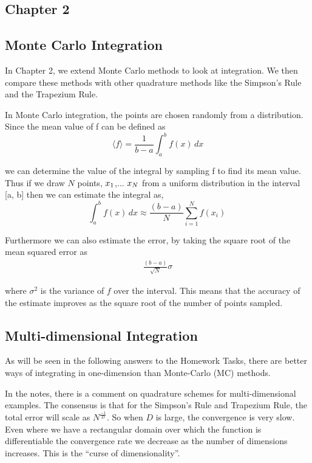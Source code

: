 \documentclass[12pt]{article}
\begin{document}
\subsection*{Chapter 2}
\subsection*{Monte Carlo Integration}

In Chapter 2, we extend Monte Carlo methods to look at integration. We then compare these methods with other quadrature methods like the Simpson's Rule and the Trapezium Rule. 

In Monte Carlo integration, the points are chosen randomly from a distribution. Since the mean value of f can be defined as
\begin{equation}
\langle f\rangle = \frac{1}{b-a}\int_{a}^{b} f(x) \,dx 
\end{equation}

we can determine the value of the integral by sampling f to find its mean value. Thus if we draw $N$ points,  $x\textsubscript{$1$}$,... $x\textsubscript{$N$}$ from a uniform distribution in the interval [a, b] then we can estimate the integral as,
\begin{equation}
\int_{a}^{b} f(x) \,dx \approx \frac{(b-a)}{N}\sum_{i=1}^{N} f(x_{i})\,
\end{equation}

Furthermore we can also estimate the error, by taking the square root of the mean
squared error as
 \begin{align} 
\frac{(b-a)}{\sqrt{N}}\sigma
\end{align}

where $\sigma^2$ is the variance of $f$ over the interval. This means that the accuracy of the estimate improves as the square root of the number of points sampled.

\subsection*{Multi-dimensional Integration}

As will be seen in the following answers to the Homework Tasks, there are better ways of integrating in one-dimension than Monte-Carlo (MC) methods.

In the notes, there is a comment on quadrature schemes for multi-dimensional examples. The consensus is that for the Simpson's Rule and Trapezium Rule, the total error will scale as $N^\frac{-1}{D}$. So when $D$ is large, the convergence is very slow. Even where we have a rectangular domain over which the function is differentiable the convergence rate we decrease as the number of dimensions increases. This is the “curse of dimensionality”.
\end{document}
